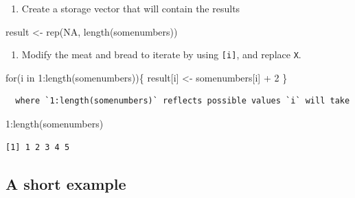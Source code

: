 \documentclass[
  letterpaper,
  DIV=11,
  numbers=noendperiod]{scrreprt}
\newenvironment{Shaded}{\begin{snugshade}}{\end{snugshade}}
\newcommand{\ConstantTok}[1]{\textcolor[rgb]{0.56,0.35,0.01}{#1}}
\newcommand{\ControlFlowTok}[1]{\textcolor[rgb]{0.00,0.23,0.31}{#1}}
\newcommand{\DecValTok}[1]{\textcolor[rgb]{0.68,0.00,0.00}{#1}}
\newcommand{\FunctionTok}[1]{\textcolor[rgb]{0.28,0.35,0.67}{#1}}
\newcommand{\NormalTok}[1]{\textcolor[rgb]{0.00,0.23,0.31}{#1}}
\newcommand{\OtherTok}[1]{\textcolor[rgb]{0.00,0.23,0.31}{#1}}
\newcommand{\SpecialCharTok}[1]{\textcolor[rgb]{0.37,0.37,0.37}{#1}}
\providecommand{\tightlist}{%
  \setlength{\itemsep}{0pt}\setlength{\parskip}{0pt}}\usepackage{longtable,booktabs,array}
\begin{document}
\begin{enumerate}
\def\labelenumi{\arabic{enumi}.}
\setcounter{enumi}{3}
\tightlist
\item
  Create a storage vector that will contain the results
\end{enumerate}

\begin{Shaded}
\begin{Highlighting}[]
\NormalTok{result }\OtherTok{\textless{}{-}} \FunctionTok{rep}\NormalTok{(}\ConstantTok{NA}\NormalTok{, }\FunctionTok{length}\NormalTok{(somenumbers))}
\end{Highlighting}
\end{Shaded}

\begin{enumerate}
\def\labelenumi{\arabic{enumi}.}
\setcounter{enumi}{4}
\tightlist
\item
  Modify the meat and bread to iterate by using \texttt{{[}i{]}}, and
  replace \texttt{X}.
\end{enumerate}

\begin{Shaded}
\begin{Highlighting}[]
\ControlFlowTok{for}\NormalTok{(i }\ControlFlowTok{in} \DecValTok{1}\SpecialCharTok{:}\FunctionTok{length}\NormalTok{(somenumbers))\{}
\NormalTok{  result[i] }\OtherTok{\textless{}{-}}\NormalTok{ somenumbers[i] }\SpecialCharTok{+} \DecValTok{2}
\NormalTok{\}}
\end{Highlighting}
\end{Shaded}

\begin{verbatim}
  where `1:length(somenumbers)` reflects possible values `i` will take 
\end{verbatim}

\begin{Shaded}
\begin{Highlighting}[]
\DecValTok{1}\SpecialCharTok{:}\FunctionTok{length}\NormalTok{(somenumbers)}
\end{Highlighting}
\end{Shaded}

\begin{verbatim}
[1] 1 2 3 4 5
\end{verbatim}

\hypertarget{a-short-example}{%
\subsection{A short example}\label{a-short-example}}
\end{document}
